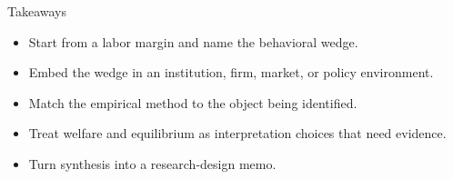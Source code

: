 \documentclass[aspectratio=169,11pt]{beamer}
\begin{document}
\begin{frame}{Takeaways}
\begin{itemize}
    \item Start from a labor margin and name the behavioral wedge.
    \item Embed the wedge in an institution, firm, market, or policy environment.
    \item Match the empirical method to the object being identified.
    \item Treat welfare and equilibrium as interpretation choices that need evidence.
    \item Turn synthesis into a research-design memo.
\end{itemize}
\end{frame}
\end{document}
